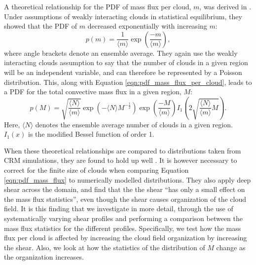 \documentclass[11pt,a4paper]{article}
\newcommand\todo[1]{\textbf{TODO: #1}}
\begin{document}
A theoretical relationship for the PDF of mass flux per cloud, $m$, was derived in \cite{CC2006I}. Under assumptions of weakly interacting clouds in statistical equilibrium, they showed that the PDF of $m$ decreased exponentially with increasing $m$:
\begin{equation}
    p(m) = \frac{1}{\langle m \rangle} \exp \left(\frac{-m}{\langle m \rangle} \right),
    \label{eqn:pdf_mass_flux_per_cloud}
\end{equation}
where angle brackets denote an ensemble average. They again use the weakly interacting clouds assumption to say that the number of clouds in a given region will be an independent variable, and can therefore be represented by a Poisson distribution. This, along with Equation \ref{eqn:pdf_mass_flux_per_cloud}, leads to a PDF for the total convective mass flux in a given region, $M$:
\begin{equation}
    p(M) = \sqrt{\frac{\langle N \rangle}{\langle m \rangle}} \exp \left( -\langle N \rangle M^{-\frac{1}{2}} \right) \exp \left( \frac{-M}{\langle m \rangle} \right)  I_1\left(2 \sqrt{\frac{\langle N \rangle}{\langle m \rangle} M}\right).
    \label{eqn:pdf_mass_flux}
\end{equation}
Here, $\langle N \rangle$ denotes the ensemble average number of clouds in a given region. $I_1(x)$ is the modified Bessel function of order 1.

When these theoretical relationships are compared to distributions taken from CRM simulations, they are found to hold up well \parencite{CC2006II}. It is however necessary to correct for the finite size of clouds when comparing Equation \ref{eqn:pdf_mass_flux} to numerically modelled distributions. They also apply deep shear across the domain, and find that the the shear ``has only a small effect on the mass flux statistics'', even though the shear causes organization of the cloud field. 
It is this finding that we investigate in more detail, through the use of systematically varying shear profiles and performing a comparison between the mass flux statistics for the different profiles. 
Specifically, we test how the mass flux per cloud is affected by increasing the cloud field organization by increasing the shear. Also, we look at how the statistics of the distribution of $M$ change as the organization increases.
\end{document}
